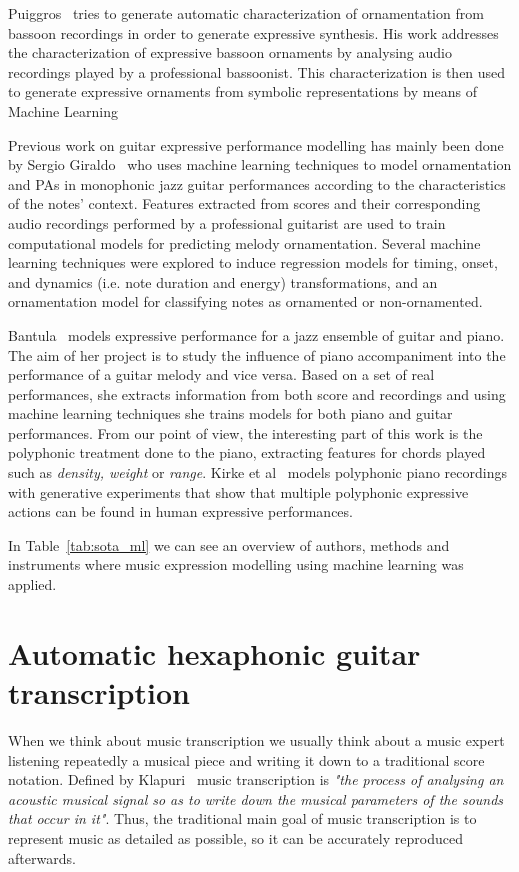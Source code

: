 Puiggros~\cite{Puiggros2006} tries to generate automatic characterization of ornamentation from bassoon recordings in order to generate expressive synthesis. His work addresses the characterization of expressive bassoon ornaments by analysing audio recordings played by a professional bassoonist. This characterization is then used to generate expressive ornaments from symbolic representations by means of Machine Learning

Previous work on guitar expressive performance modelling has mainly been done by Sergio Giraldo~\cite{Giraldo2016} who uses machine learning techniques to model ornamentation and PAs in monophonic jazz guitar performances according to the characteristics of the notes' context. Features extracted from scores and their corresponding audio recordings performed by a professional guitarist are used to train computational models for predicting melody ornamentation. Several machine learning techniques were explored to induce regression models for timing, onset, and dynamics (i.e. note duration and energy) transformations, and an ornamentation model for classifying notes as ornamented or non-ornamented.

Bantula~\cite{bantula2016} models expressive performance for a jazz ensemble of guitar and piano. The aim of her project is to study the influence of piano accompaniment into the performance of a guitar melody and vice versa. Based on a set of real performances, she extracts information from both score and recordings and using machine learning techniques she trains models for both piano and guitar performances. From our point of view, the interesting part of this work is the polyphonic treatment done to the piano, extracting features for chords played such as \textit{density, weight} or \textit{range}. Kirke et al~\cite{KirkeAlexisMiranda2013} models polyphonic piano recordings with generative experiments that show that multiple polyphonic expressive actions can be found in human expressive performances. 

In Table~\ref{tab:sota_ml} we can see an overview of authors, methods and instruments where music expression modelling using machine learning was applied.



\section{Automatic hexaphonic guitar transcription}
\label{sec:autohexaguit}
When we think about music transcription we usually think about a music expert listening repeatedly a musical piece and writing it down to a traditional score notation. Defined by Klapuri~\cite{Klapuri2004} music transcription is \textit{"the process of analysing an acoustic musical signal so as to write down the musical parameters of the sounds that occur in it"}. Thus, the traditional main goal of music transcription is to represent music as detailed as possible, so it can be accurately reproduced afterwards. 

